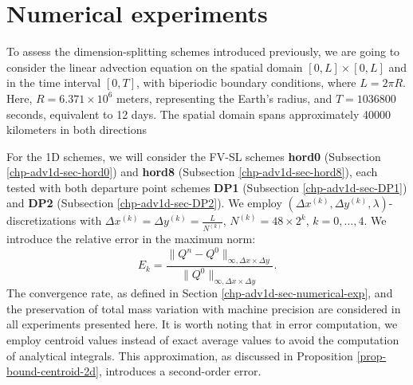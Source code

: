 \section{Numerical experiments}
\label{sec-ds-exp}
To assess the dimension-splitting schemes introduced previously, we are going to consider the linear advection 
equation on the spatial domain $[0,L]\times[0,L]$ and in the time interval $[0,T]$, 
with biperiodic boundary conditions, where $L = 2 \pi R$. Here, $R = 6.371 \times 10^6$ meters, 
representing the Earth's radius, and $T = 1036800$ seconds, equivalent to 12 days. 
The spatial domain spans approximately 40000 kilometers in both directions

For the 1D schemes, we will consider the FV-SL schemes \textbf{hord0} (Subsection \ref{chp-adv1d-sec-hord0}) and
\textbf{hord8} (Subsection \ref{chp-adv1d-sec-hord8}), 
each tested with both departure point schemes \textbf{DP1} (Subsection \ref{chp-adv1d-sec-DP1}) and \textbf{DP2} (Subsection \ref{chp-adv1d-sec-DP2}).
We employ $(\Delta x^{(k)},\Delta y^{(k)},\lambda)$-discretizations with $\Delta x^{(k)} = \Delta y^{(k)} = \frac{L}{N^{(k)}}$,
$N^{(k)} = 48 \times 2^k$, $k=0,\ldots, 4$.
We introduce the relative error in the maximum norm:
\begin{equation*}
	E_k = 
	\frac{\| Q^n - Q^0 \|_{\infty, \Delta x \times \Delta y}}
	{\|Q^0\|_{\infty, \Delta x \times \Delta y}}.
\end{equation*}
The convergence rate, as defined in Section \ref{chp-adv1d-sec-numerical-exp}, and the preservation of total mass variation with 
machine precision are considered in all experiments presented here.
It is worth noting that in error computation, we employ centroid values instead of exact average values to avoid 
the computation of analytical integrals.
This approximation, as discussed in Proposition \ref{prop-bound-centroid-2d}, introduces a second-order error.

